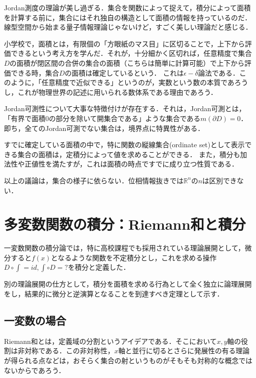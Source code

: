 \documentclass[uplatex, dvipdfmx]{jsreport}
\begin{document}
\begin{screen}
    Jordan測度の理論が美し過ぎる．集合を関数によって捉えて，積分によって面積を計算する前に，集合にはそれ独自の構造として面積の情報を持っているのだ．線型空間から始まる量子情報理論じゃないけど，すごく美しい理論だと感じる．

    小学校で，面積とは，有限個の「方眼紙のマス目」に区切ることで，上下から評価できるという考え方を学んだ．それが，十分細かく区切れば，任意精度で集合$D$の面積が閉区間の合併の集合の面積（こちらは簡単に計算可能）で上下から評価できる時，集合$D$の面積は確定しているという．
    これは$\epsilon-\delta$論法である．このように，「任意精度で近似できる」というのが，実数という数の本質であろうし，これが物理世界の記述に用いられる数体系である理由であろう．

    Jordan可測性について大事な特徴付けが存在する．それは，Jordan可測とは，「有界で面積$0$の部分を除いて開集合である」ような集合である$m(\partial D)=0$．即ち，全てのJordan可測でない集合は，境界点に特異性がある．

    すでに確定している面積の中で，特に関数の縦線集合(ordinate set)として表示できる集合の面積は，定積分によって値を求めることができる．
    また，積分も加法性や正値性を満たすが，これは面積の時点ですでに成り立つ性質である．

    以上の議論は，集合の様子に依らない．位相情報抜きでは$\mathbb{R}^n$の$n$は区別できない．
\end{screen}

\section{多変数関数の積分：Riemann和と積分}
一変数関数の積分論では，特に高校課程でも採用されている理論展開として，微分すると$f(x)$となるような関数を不定積分とし，これを求める操作$D\circ \int = id, \int\circ D=?$を積分と定義した．

別の理論展開の仕方として，積分を面積を求める行為として全く独立に論理展開をし，結果的に微分と逆演算となることを到達すべき定理として示す．

\subsection{一変数の場合}
Riemann和とは，定義域の分割というアイデアである．そこにおいて$x,y$軸の役割は非対称である．この非対称性，$x$軸と並行に切るとさらに発展性の有る理論が得られる点などは，おそらく集合の射というものがそもそも対称的な概念ではないからであろう．
\end{document}
